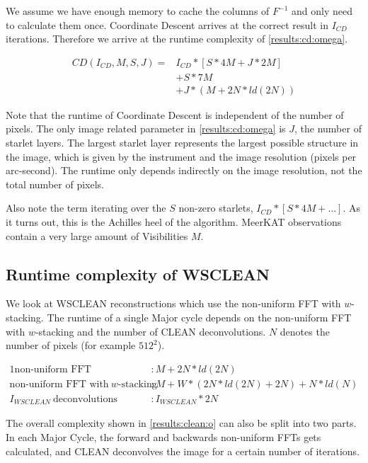 We assume we have enough memory to cache the columns of $F^{-1}$ and only need to calculate them once. Coordinate Descent arrives at the correct result in $I_{CD}$ iterations. Therefore we arrive at the runtime complexity of \eqref{results:cd:omega}.

\begin{equation}\label{results:cd:omega}
\begin{aligned}
	CD(I_{CD}, M, S, J) = &I_{CD} * [S * 4M + J * 2M]\\
		&+  S*7M\\
		&+ J*(M + 2N*ld(2N))
\end{aligned}
\end{equation}

Note that the runtime of Coordinate Descent is independent of the number of pixels. The only image related parameter in \eqref{results:cd:omega} is $J$, the number of starlet layers. The largest starlet layer represents the largest possible structure in the image, which is given by the instrument and the image resolution (pixels per arc-second). The runtime only depends indirectly on the image resolution, not the total number of pixels.

Also note the term iterating over the $S$ non-zero starlets, $ I_{CD} * [S * 4M +\ldots]$. As it turns out, this is the Achilles heel of the algorithm. MeerKAT observations contain a very large amount of Visibilities $M$.

\subsection{Runtime complexity of WSCLEAN}
We look at WSCLEAN reconstructions which use the non-uniform FFT with $w$-stacking. The runtime of a single Major cycle depends on the non-uniform FFT with $w$-stacking and the number of CLEAN deconvolutions. $N$ denotes the number of pixels (for example $512^2$).

\begin{alignat*}{1}
	\text{non-uniform FFT} &: M + 2N*ld(2N)\\
	\text{non-uniform FFT with} \:w\text{-stacking} &:M + W*(2N*ld(2N) + 2N) + N*ld(N)\\
	I_{WSCLEAN}\: \text{deconvolutions} &: I_{WSCLEAN}*2N
\end{alignat*}

The overall complexity shown in \eqref{results:clean:o} can also be split into two parts. In each Major Cycle, the forward and backwards non-uniform FFTs gets calculated, and CLEAN deconvolves the image for a certain number of iterations.

